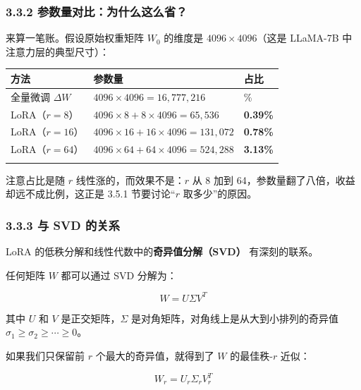 \documentclass[
  chinese,
]{ctexart}
\begin{document}
\subsubsection{3.3.2
参数量对比：为什么这么省？}\label{ux53c2ux6570ux91cfux5bf9ux6bd4ux4e3aux4ec0ux4e48ux8fd9ux4e48ux7701}

来算一笔账。假设原始权重矩阵 \(W_0\) 的维度是 \(4096 \times 4096\)（这是
LLaMA-7B 中注意力层的典型尺寸）：

\begin{center}
\begin{tabular}{@{}>{\raggedright\arraybackslash}p{} >{\raggedright\arraybackslash}p{} >{\raggedright\arraybackslash}p{}@{}}
\toprule\noalign{}
方法 & 参数量 & 占比 \\
\midrule\noalign{}
全量微调 \(\Delta W\) & \(4096 \times 4096 = 16{,}777{,}216\) & 100\% \\
LoRA（\(r=8\)） & \(4096 \times 8 + 8 \times 4096 = 65{,}536\) & \textbf{0.39\%} \\
LoRA（\(r=16\)） & \(4096 \times 16 + 16 \times 4096 = 131{,}072\) & \textbf{0.78\%} \\
LoRA（\(r=64\)） & \(4096 \times 64 + 64 \times 4096 = 524{,}288\) & \textbf{3.13\%} \\
\bottomrule\noalign{}
\end{tabular}
\end{center}

注意占比是随 \(r\) 线性涨的，而效果不是：\(r\) 从 8 加到
64，参数量翻了八倍，收益却远不成比例，这正是 3.5.1 节要讨论``\(r\)
取多少''的原因。

\subsubsection{3.3.3 与 SVD 的关系}\label{ux4e0e-svd-ux7684ux5173ux7cfb}

LoRA 的低秩分解和线性代数中的\textbf{奇异值分解（SVD）} 有深刻的联系。

任何矩阵 \(W\) 都可以通过 SVD 分解为：

\[W = U \Sigma V^T\]

其中 \(U\) 和 \(V\) 是正交矩阵，\(\Sigma\)
是对角矩阵，对角线上是从大到小排列的奇异值
\(\sigma_1 \geq \sigma_2 \geq \cdots \geq 0\)。

如果我们只保留前 \(r\) 个最大的奇异值，就得到了 \(W\) 的最佳秩-\(r\)
近似：

\[W_r = U_r \Sigma_r V_r^T\]
\end{document}
